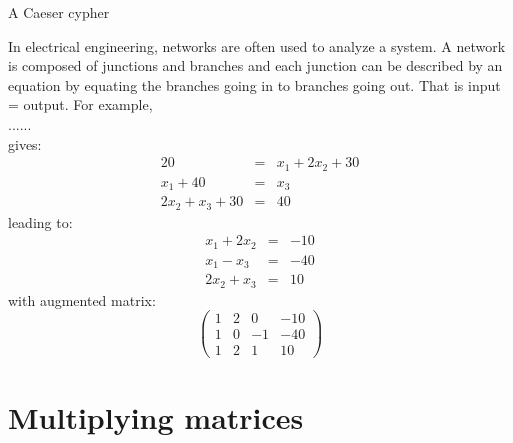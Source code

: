 \documentclass{ximera}
\begin{document}
\begin{example}[Cryptography]
  A Caeser cypher
\end{example}





\begin{example}[Networks]
In electrical engineering, networks are often used to analyze a system. A network is composed of junctions and branches and each junction can be described by an equation by equating the branches going in to branches going out. That is input = output. For example,\\

......\\

gives:
\begin{eqnarray*}
20 &=& x_{1} + 2x_{2} + 30\\
x_{1} + 40 &=& x_{3}\\
2x_{2} + x_{3} + 30 &=& 40
\end{eqnarray*}
leading to:
\begin{eqnarray*}
x_{1}+2x_{2} &=& -10\\
x_{1} -x_{3}&=& -40\\
2x_{2} + x_{3}  &=& 10
\end{eqnarray*}
with augmented matrix:
\[\left(\begin{array}{ccc|c}
1 & 2 & 0 & -10\\
1 & 0 & -1 & -40\\
1 & 2 & 1 & 10
\end{array}\right)\]
\end{example}





\section{Multiplying matrices}
\end{document}
